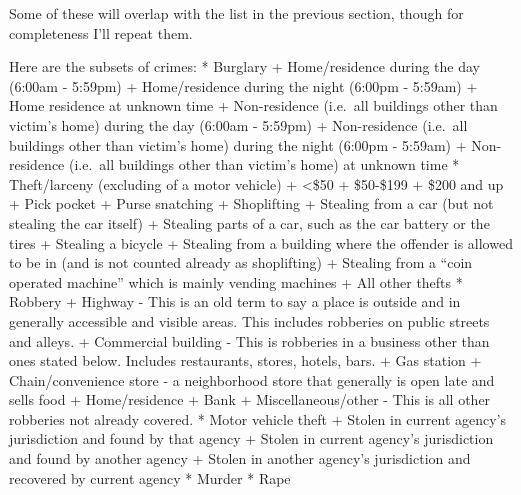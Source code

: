 \documentclass[
  12pt,
  openany]{book}
\begin{document}
Some of these will overlap with the list in the previous section, though for completeness I'll repeat them.

Here are the subsets of crimes:
* Burglary
+ Home/residence during the day (6:00am - 5:59pm)
+ Home/residence during the night (6:00pm - 5:59am)
+ Home residence at unknown time
+ Non-residence (i.e.~all buildings other than victim's home) during the day (6:00am - 5:59pm)
+ Non-residence (i.e.~all buildings other than victim's home) during the night (6:00pm - 5:59am)
+ Non-residence (i.e.~all buildings other than victim's home) at unknown time
* Theft/larceny (excluding of a motor vehicle)
+ \textless\$50
+ \$50-\$199
+ \$200 and up
+ Pick pocket
+ Purse snatching
+ Shoplifting
+ Stealing from a car (but not stealing the car itself)
+ Stealing parts of a car, such as the car battery or the tires
+ Stealing a bicycle
+ Stealing from a building where the offender is allowed to be in (and is not counted already as shoplifting)
+ Stealing from a ``coin operated machine'' which is mainly vending machines
+ All other thefts
* Robbery
+ Highway - This is an old term to say a place is outside and in generally accessible and visible areas. This includes robberies on public streets and alleys.
+ Commercial building - This is robberies in a business other than ones stated below. Includes restaurants, stores, hotels, bars.
+ Gas station
+ Chain/convenience store - a neighborhood store that generally is open late and sells food
+ Home/residence
+ Bank
+ Miscellaneous/other - This is all other robberies not already covered.
* Motor vehicle theft
+ Stolen in current agency's jurisdiction and found by that agency
+ Stolen in current agency's jurisdiction and found by another agency
+ Stolen in another agency's jurisdiction and recovered by current agency
* Murder
* Rape
\end{document}
